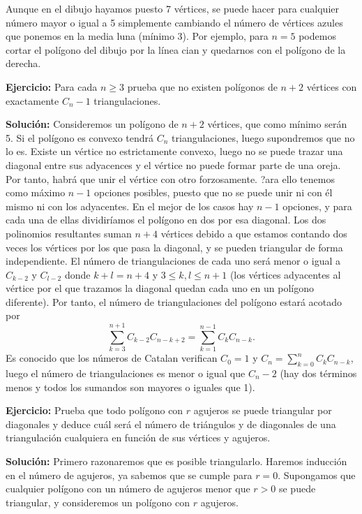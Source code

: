 \documentclass{amsart}
\begin{document}
Aunque en el dibujo hayamos puesto 7 vértices, se puede hacer para cualquier número mayor o igual a 5 simplemente cambiando el número de vértices azules que ponemos en la media luna (mínimo 3). Por ejemplo, para $n=5$ podemos cortar el polígono del dibujo por la línea cian y quedarnos con el polígono de la derecha.

\bigskip

\textbf{Ejercicio:} Para cada $n \geq 3$  prueba que no existen polígonos de $n + 2$
vértices con exactamente $C_n - 1$ triangulaciones.

\bigskip

\textbf{Solución:} Consideremos un polígono de $n+2$ vértices, que como mínimo serán 5. Si el polígono es convexo tendrá $C_n$ triangulaciones, luego supondremos que no lo es. Existe un vértice no estrictamente convexo, luego no se puede trazar una diagonal entre sus adyacences y el vértice no puede formar parte de una oreja. Por tanto, habrá que unir el vértice con otro forzosamente. ?ara ello tenemos como máximo $n-1$ opciones posibles, puesto que no se puede unir ni con él mismo ni con los adyacentes. En el mejor de los casos hay $n-1$ opciones, y para cada una de ellas dividiríamos el polígono en dos por esa diagonal. Los dos polinomios resultantes suman $n+4$ vértices debido a que estamos contando dos veces los vértices por los que pasa la diagonal, y se pueden triangular de forma independiente. El número de triangulaciones de cada uno será menor o igual a $C_{k-2}$ y $C_{l-2}$ donde $k+l=n+4$ y $3\leq k,l\leq n+1$ (los vértices adyacentes al vértice por el que trazamos la diagonal quedan cada uno en un polígono diferente). Por tanto, el número de triangulaciones del polígono estará acotado por
\[\sum_{k=3}^{n+1} C_{k-2} C_{n-k+2}=\sum_{k=1}^{n-1} C_{k} C_{n-k}.\]
Es conocido que los números de Catalan verifican $C_0=1$ y 
$C_n=\sum\limits_{k=0}^n C_k C_{n-k}$,
luego el número de triangulaciones es menor o igual que $C_n-2$ (hay dos términos menos y todos los sumandos son mayores o iguales que 1).

\bigskip

\textbf{Ejercicio:} Prueba que todo polígono con $r$ agujeros se puede triangular
por diagonales y deduce cuál será el número de triángulos y de
diagonales de una triangulación cualquiera en función de sus
vértices y agujeros.

\bigskip

\textbf{Solución:} Primero razonaremos que es posible triangularlo. Haremos inducción en el número de agujeros, ya sabemos que se cumple para $r=0$. Supongamos que cualquier polígono con un número de agujeros menor que $r>0$ se puede triangular, y consideremos un polígono con $r$ agujeros.
\end{document}
